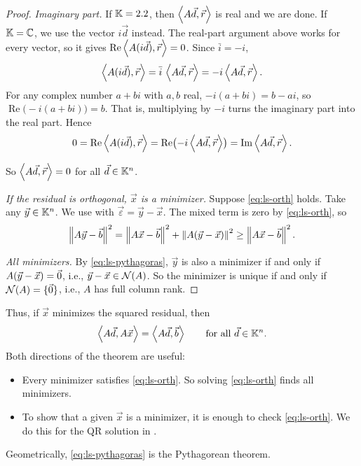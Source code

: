 \begin{proof}
  \emph{Imaginary part.} If $\mathbb{K} = 2.2$, then $\left\langle A\vec{d}, \vec{r} \right\rangle$ is real and we are done. If $\mathbb{K} = \mathbb{C}$, we use the vector $i\vec{d}$ instead. The real-part argument above works for every vector, so it gives $\operatorname{Re}\left\langle A(i\vec{d}), \vec{r} \right\rangle = 0$. Since $\bar{i} = -i$,
  \begin{equation*}
    \left\langle A(i\vec{d}), \vec{r} \right\rangle = \bar{i}\,\left\langle A\vec{d}, \vec{r} \right\rangle = -i\left\langle A\vec{d}, \vec{r} \right\rangle.
  \end{equation*}
  For any complex number $a + bi$ with $a, b$ real, $-i(a + bi) = b - ai$, so $\operatorname{Re}\bigl(-i(a + bi)\bigr) = b$. That is, multiplying by $-i$ turns the imaginary part into the real part. Hence
  \begin{equation*}
    0 = \operatorname{Re}\left\langle A(i\vec{d}), \vec{r} \right\rangle = \operatorname{Re}\bigl(-i\left\langle A\vec{d}, \vec{r} \right\rangle\bigr) = \operatorname{Im}\left\langle A\vec{d}, \vec{r} \right\rangle.
  \end{equation*}

  So $\left\langle A\vec{d}, \vec{r} \right\rangle = 0$ for all $\vec{d} \in \mathbb{K}^n$.

  \emph{If the residual is orthogonal, $\vec{x}$ is a minimizer.} Suppose \eqref{eq:ls-orth} holds. Take any $\vec{y} \in \mathbb{K}^n$. We use  with $\vec{\varepsilon} = \vec{y} - \vec{x}$. The mixed term is zero by \eqref{eq:ls-orth}, so
  \begin{equation}
    \label{eq:ls-pythagoras}
    \left\lVert A\vec{y} - \vec{b} \right\rVert^2 = \left\lVert A\vec{x} - \vec{b} \right\rVert^2 + \left\lVert A(\vec{y} - \vec{x}) \right\rVert^2 \ge \left\lVert A\vec{x} - \vec{b} \right\rVert^2.
  \end{equation}

  \emph{All minimizers.} By \eqref{eq:ls-pythagoras}, $\vec{y}$ is also a minimizer if and only if $A(\vec{y} - \vec{x}) = \vec{0}$, i.e., $\vec{y} - \vec{x} \in \mathcal{N}(A)$. So the minimizer is unique if and only if $\mathcal{N}(A) = \{\vec{0}\}$, i.e., $A$ has full column rank.
\end{proof}

Thus, if $\vec{x}$ minimizes the squared residual, then
\begin{equation*}
  \left\langle A\vec{d}, A\vec{x} \right\rangle = \left\langle A\vec{d}, \vec{b} \right\rangle \qquad \text{for all } \vec{d} \in \mathbb{K}^n.
\end{equation*}
Both directions of the theorem are useful:
\begin{itemize}
  \item Every minimizer satisfies \eqref{eq:ls-orth}. So solving \eqref{eq:ls-orth} finds all minimizers.
  \item To show that a given $\vec{x}$ is a minimizer, it is enough to check \eqref{eq:ls-orth}. We do this for the QR solution in .
\end{itemize}
Geometrically, \eqref{eq:ls-pythagoras} is the Pythagorean theorem.

